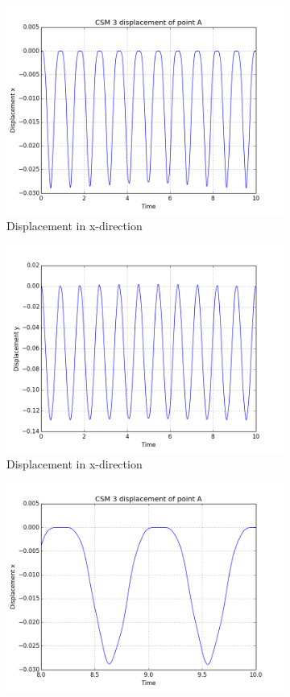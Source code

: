 \begin{figure}[ht] 
  \begin{subfigure}[b]{0.5\linewidth}
    \centering
    \includegraphics[width=0.75\linewidth]{./Verification_Validation//Hron_Turek/dis_x.png} 
    \caption{Displacement in x-direction} 
    \label{fig7:a} 
    \vspace{4ex}
  \end{subfigure}%
  \begin{subfigure}[b]{0.5\linewidth}
    \centering
    \includegraphics[width=0.75\linewidth]{./Verification_Validation//Hron_Turek/dis_y.png} 
    \caption{Displacement in x-direction} 
    \label{fig7:b} 
    \vspace{4ex}
  \end{subfigure} 
  \begin{subfigure}[b]{0.5\linewidth}
    \centering
    \includegraphics[width=0.75\linewidth]{./Verification_Validation//Hron_Turek/dis_x_short.png} 

\end{subfigure}
\end{figure}
